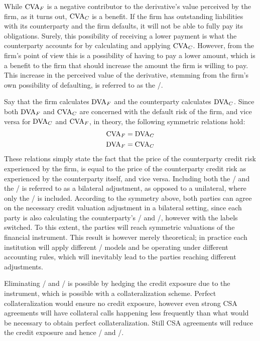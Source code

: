\documentclass[main.tex]{subfiles}
\begin{document}
        While $\CVA/_{F}$ is a negative contributor to the derivative's value perceived by the firm, 
        as it turns out, $\CVA/_{C}$ is a benefit.
        If the firm has outstanding liabilities with its counterparty
        and the firm defaults, it will not be able to fully pay its obligations. 
        Surely, this possibility of receiving a lower payment is what the counterparty accounts for 
        by calculating and applying $\CVA/_{C}$.
        However, from the firm's point of view this is a possibility of having to pay a lower amount,
        which is a benefit to the firm that should increase the amount the firm is willing to pay.
        This increase in the perceived value of the derivative, 
        stemming from the firm's own possibility of defaulting, 
        is referred to as the \DVA/.

        Say that the firm calculates $\DVA/_{F}$ and the counterparty calculates $\DVA/_{C}$.
        Since both $\DVA/_{F}$ and $\CVA/_{C}$ are concerned with the default risk of the firm,
        and vice versa for $\DVA/_{C}$ and $\CVA/_{F}$, in theory, the following symmetric relations hold:
            \begin{align*}
                \CVA/_{F} &= \DVA/_{C} \\
                \DVA/_{F} &= \CVA/_{C}
            \end{align*}
        These relations simply state the fact that
        the price of the counterparty credit risk experienced by the firm,
        is equal to the price of the counterparty credit risk as experienced by the counterparty itself, and vice versa.
        Including both the \CVA/ and the \DVA/ is referred to as a bilateral adjustment,
        as opposed to a unilateral, where only the \CVA/ is included.
        According to the symmetry above,
        both parties can agree on the necessary credit valuation adjustment in a bilateral setting,
        since each party is also calculating the counterparty's \CVA/ and \DVA/, however with the labels switched.
        To this extent, the parties will reach symmetric valuations of the financial instrument. 
        This result is however merely theoretical; 
        in practice each institution will apply different \CVA/ models
        and be operating under different accounting rules, 
        which will inevitably lead to the parties reaching different adjustments. 
        
        Eliminating \CVA/ and \DVA/ is possible by hedging the credit exposure due to the instrument,
        which is possible with a collateralization scheme. 
        Perfect collateralization would ensure no credit exposure,
        however even strong CSA agreements will have collateral calls happening less frequently
        than what would be necessary to obtain perfect collateralization.
        Still CSA agreements will reduce the credit exposure and hence \CVA/ and \DVA/.
\end{document}
